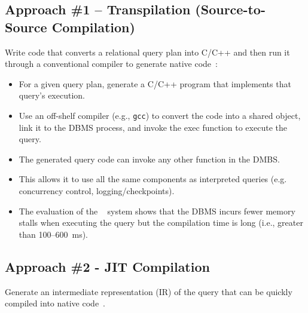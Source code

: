 \documentclass[11pt]{article}
\begin{document}

\subsection*{Approach \#1 -- Transpilation (Source-to-Source Compilation)}
Write code that converts a relational query plan into 
C/C++ and then run it through a conventional compiler to generate native 
code~\cite{krikellas10}:
\begin{itemize}
    \item
    For a given query plan, generate a C/C++ program that implements that query's execution.
    
    \item
    Use an off-shelf compiler (e.g., \texttt{gcc}) to convert the code into a shared object, 
    link it to the DBMS process, and invoke the exec function to execute the query.
    
    \item
    The generated query code can invoke any other function in the DMBS.
    
    \item
    This allows it to use all the same components as interpreted queries (e.g. 
    concurrency control, logging/checkpoints).
    
    \item
    The evaluation of the ~\cite{krikellas10} system shows that the DBMS incurs fewer 
    memory stalls when executing the query but the compilation time is long (i.e., 
    greater than 100--600~ms).
\end{itemize}
    
\subsection*{Approach \#2 - JIT Compilation}
Generate an intermediate representation (IR) of the query that can be quickly compiled into 
native code~\cite{neumann11}.
\end{document}
